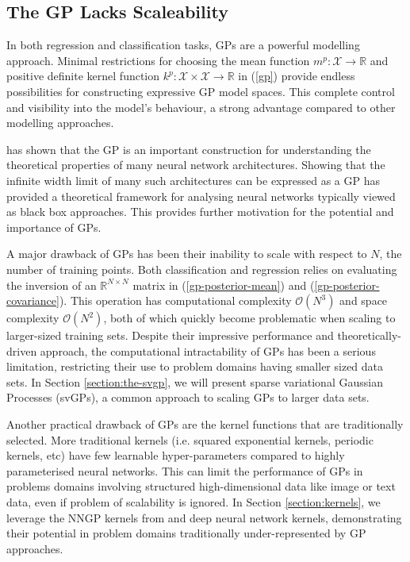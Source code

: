 \documentclass{article}
\numberwithin{equation}{section}
\begin{document}
\subsection{The GP Lacks Scaleability}\label{section:gp-problems}
In both regression and classification tasks, GPs are a powerful modelling approach. Minimal restrictions for choosing the mean function $m^p: \mathcal{X} \rightarrow \mathbb{R}$ and positive definite kernel function $k^p: \mathcal{X} \times \mathcal{X} \rightarrow \mathbb{R}$ in (\ref{gp}) provide endless possibilities for constructing expressive GP model spaces. This complete control and visibility into the model's behaviour, a strong advantage compared to other modelling approaches. 

\cite{novak2019neural} has shown that the GP is an important construction for understanding the theoretical properties of many neural network architectures. Showing that the infinite width limit of many such architectures can be expressed as a GP has provided a theoretical framework for analysing neural networks typically viewed as black box approaches. This provides further motivation for the potential and importance of GPs.

A major drawback of GPs has been their inability to scale with respect to $N$, the number of training points. Both classification and regression relies on evaluating the inversion of an $\mathbb{R}^{N \times N}$ matrix in (\ref{gp-posterior-mean}) and (\ref{gp-posterior-covariance}). This operation has computational complexity $\mathcal{O}(N^3)$ and space complexity $\mathcal{O}(N^2)$, both of which quickly become problematic when scaling to larger-sized training sets. Despite their impressive performance and theoretically-driven approach, the computational intractability of GPs has been a serious limitation, restricting their use to problem domains having smaller sized data sets. In Section \ref{section:the-svgp}, we will present sparse variational Gaussian Processes (svGPs), a common approach to scaling GPs to larger data sets.

Another practical drawback of GPs are the kernel functions that are traditionally selected. More traditional kernels (i.e. squared exponential kernels, periodic kernels, etc) have few learnable hyper-parameters compared to highly parameterised neural networks. This can limit the performance of GPs in problems domains involving structured high-dimensional data like image or text data, even if problem of scalability is ignored. In Section \ref{section:kernels}, we leverage the NNGP kernels from \cite{novak2019neural} and deep neural network kernels, demonstrating their potential in problem domains traditionally under-represented by GP approaches.
\end{document}
